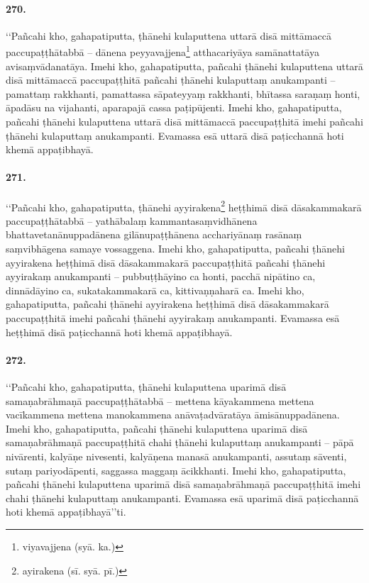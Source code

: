 \paragraph{270.} ‘‘Pañcahi kho, gahapatiputta, ṭhānehi kulaputtena uttarā disā mittāmaccā paccupaṭṭhātabbā – dānena peyyavajjena\footnote{viyavajjena (syā. ka.)} atthacariyāya samānattatāya avisaṃvādanatāya. Imehi kho, gahapatiputta, pañcahi ṭhānehi kulaputtena uttarā disā mittāmaccā paccupaṭṭhitā pañcahi ṭhānehi kulaputtaṃ anukampanti – pamattaṃ rakkhanti, pamattassa sāpateyyaṃ rakkhanti, bhītassa saraṇaṃ honti, āpadāsu na vijahanti, aparapajā cassa paṭipūjenti. Imehi kho, gahapatiputta, pañcahi ṭhānehi kulaputtena uttarā disā mittāmaccā paccupaṭṭhitā imehi pañcahi ṭhānehi kulaputtaṃ anukampanti. Evamassa esā uttarā disā paṭicchannā hoti khemā appaṭibhayā.

\paragraph{271.} ‘‘Pañcahi kho, gahapatiputta, ṭhānehi ayyirakena\footnote{ayirakena (sī. syā. pī.)} heṭṭhimā disā dāsakammakarā paccupaṭṭhātabbā – yathābalaṃ kammantasaṃvidhānena bhattavetanānuppadānena gilānupaṭṭhānena acchariyānaṃ rasānaṃ saṃvibhāgena samaye vossaggena. Imehi kho, gahapatiputta, pañcahi ṭhānehi ayyirakena heṭṭhimā disā dāsakammakarā paccupaṭṭhitā pañcahi ṭhānehi ayyirakaṃ anukampanti – pubbuṭṭhāyino ca honti, pacchā nipātino ca, dinnādāyino ca, sukatakammakarā ca, kittivaṇṇaharā ca. Imehi kho, gahapatiputta, pañcahi ṭhānehi ayyirakena heṭṭhimā disā dāsakammakarā paccupaṭṭhitā imehi pañcahi ṭhānehi ayyirakaṃ anukampanti. Evamassa esā heṭṭhimā disā paṭicchannā hoti khemā appaṭibhayā.

\paragraph{272.} ‘‘Pañcahi kho, gahapatiputta, ṭhānehi kulaputtena uparimā disā samaṇabrāhmaṇā paccupaṭṭhātabbā – mettena kāyakammena mettena vacīkammena mettena manokammena anāvaṭadvāratāya āmisānuppadānena. Imehi kho, gahapatiputta, pañcahi ṭhānehi kulaputtena uparimā disā samaṇabrāhmaṇā paccupaṭṭhitā chahi ṭhānehi kulaputtaṃ anukampanti – pāpā nivārenti, kalyāṇe nivesenti, kalyāṇena manasā anukampanti, assutaṃ sāventi, sutaṃ pariyodāpenti, saggassa maggaṃ ācikkhanti. Imehi kho, gahapatiputta, pañcahi ṭhānehi kulaputtena uparimā disā samaṇabrāhmaṇā paccupaṭṭhitā imehi chahi ṭhānehi kulaputtaṃ anukampanti. Evamassa esā uparimā disā paṭicchannā hoti khemā appaṭibhayā’’ti.

